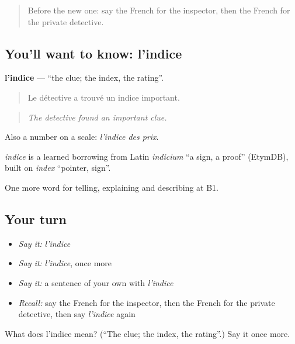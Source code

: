 \begin{quote}
Before the new one: say the French for the inspector, then the French for the private detective.
\end{quote}

\subsection*{You'll want to know: l'indice}
\textbf{l'indice} — \textquotedblleft{}the clue; the index, the rating\textquotedblright{}.

\begin{quote}
Le détective a trouvé un indice important.
\end{quote}

\begin{quote}
\emph{The detective found an important clue.}
\end{quote}

Also a number on a scale: \emph{l'indice des prix}.

\begin{cousinweb}
\emph{indice} is a learned borrowing from Latin \emph{indicium} \textquotedblleft{}a sign, a proof\textquotedblright{} (EtymDB), built on \emph{index} \textquotedblleft{}pointer, sign\textquotedblright{}.
\end{cousinweb}

\begin{grammarlens}[title={What you've built}]
One more word for telling, explaining and describing at B1.
\end{grammarlens}

\subsection*{Your turn}
\begin{itemize}
\raggedright
  \item \emph{Say it:} \emph{l'indice}
  \item \emph{Say it:} \emph{l'indice}, once more
  \item \emph{Say it:} a sentence of your own with \emph{l'indice}
  \item \emph{Recall:} say the French for the inspector, then the French for the private detective, then say \emph{l'indice} again
\end{itemize}

\begin{tcolorbox}[breakable,colback=teal!4,colframe=teal!35!black,title={Before you move on}]
What does l'indice mean? (\textquotedblleft{}The clue; the index, the rating\textquotedblright{}.) Say it once more.
\end{tcolorbox}
